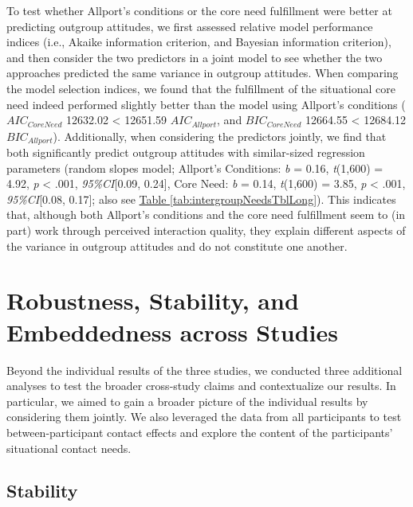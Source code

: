 \documentclass[man, 12pt, a4paper, mask]{apa7}
\theoremstyle{break}
\theoremstyle{plain}
\newcommand{\tblref}[2][]{\hyperref[#2]{Table \ref*{#2}#1}}
\begin{document}
To test whether Allport's conditions or the core need fulfillment were
better at predicting outgroup attitudes, we first assessed relative
model performance indices (i.e., Akaike information criterion, and
Bayesian information criterion), and then consider the two predictors in
a joint model to see whether the two approaches predicted the same
variance in outgroup attitudes. When comparing the model selection
indices, we found that the fulfillment of the situational core need
indeed performed slightly better than the model using Allport's
conditions (\(AIC_{CoreNeed}\) 12632.02 \textless{} 12651.59
\(AIC_{Allport}\), and \(BIC_{CoreNeed}\) 12664.55 \textless{} 12684.12
\(BIC_{Allport}\)). Additionally, when considering the predictors
jointly, we find that both significantly predict outgroup attitudes with
similar-sized regression parameters (random slopes model; Allport's
Conditions: \textit{b} = 0.16, \textit{t}(1,600) = 4.92, \textit{p}
\textless{} .001, \textit{95\%CI}{[}0.09, 0.24{]}, Core Need: \textit{b}
= 0.14, \textit{t}(1,600) = 3.85, \textit{p} \textless{} .001,
\textit{95\%CI}{[}0.08, 0.17{]}; also see
\tblref{tab:intergroupNeedsTblLong}). This indicates that, although both
Allport's conditions and the core need fulfillment seem to (in part)
work through perceived interaction quality, they explain different
aspects of the variance in outgroup attitudes and do not constitute one
another.

\section{Robustness, Stability, and Embeddedness across Studies}

Beyond the individual results of the three studies, we conducted three
additional analyses to test the broader cross-study claims and
contextualize our results. In particular, we aimed to gain a broader
picture of the individual results by considering them jointly. We also
leveraged the data from all participants to test between-participant
contact effects and explore the content of the participants' situational
contact needs.

\subsection{Stability}
\end{document}
